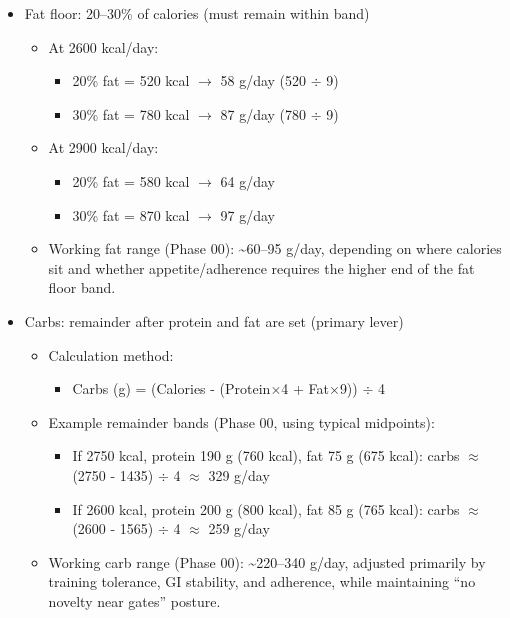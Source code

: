 \documentclass[10pt]{article}
\begin{document}
\begin{enumerate}
\begin{itemize}
\item Fat floor: 20–30\% of calories (must remain within band)
  \begin{itemize}
  \item At 2600 kcal/day:
    \begin{itemize}
    \item 20\% fat = 520 kcal $\to$ 58 g/day (520 \ensuremath{\div} 9)
    \item 30\% fat = 780 kcal $\to$ 87 g/day (780 \ensuremath{\div} 9)
    \end{itemize}
  \item At 2900 kcal/day:
    \begin{itemize}
    \item 20\% fat = 580 kcal $\to$ 64 g/day
    \item 30\% fat = 870 kcal $\to$ 97 g/day
    \end{itemize}
  \item Working fat range (Phase 00): \textasciitilde 60–95 g/day, depending on where calories sit and whether appetite/adherence requires the higher end of the fat floor band.
  \end{itemize}

\item Carbs: remainder after protein and fat are set (primary lever)
  \begin{itemize}
  \item Calculation method:
    \begin{itemize}
    \item Carbs (g) = (Calories - (Protein\ensuremath{\times}4 + Fat\ensuremath{\times}9)) \ensuremath{\div} 4
    \end{itemize}
  \item Example remainder bands (Phase 00, using typical midpoints):
    \begin{itemize}
    \item If 2750 kcal, protein 190 g (760 kcal), fat 75 g (675 kcal): carbs $\approx$ (2750 - 1435) \ensuremath{\div} 4 $\approx$ 329 g/day
    \item If 2600 kcal, protein 200 g (800 kcal), fat 85 g (765 kcal): carbs $\approx$ (2600 - 1565) \ensuremath{\div} 4 $\approx$ 259 g/day
    \end{itemize}
  \item Working carb range (Phase 00): \textasciitilde 220–340 g/day, adjusted primarily by training tolerance, GI stability, and adherence, while maintaining “no novelty near gates” posture.
  \end{itemize}
\end{itemize}

\end{enumerate}
\end{document}
